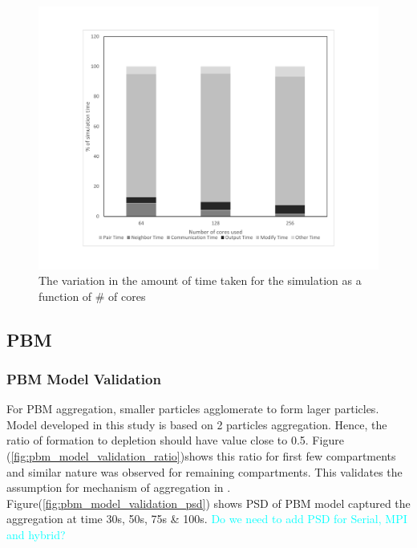 \documentclass[preprint,11pt,authoryear]{elsarticle}
\begin{document}
\begin{figure}[H]
\centering
\includegraphics[scale=0.5]{rslts_DEM_percent_plot.pdf}
\caption{The variation in the amount of time taken for the simulation as a function of \# of cores}
\label{fig:rslts_DEM_percent_plot}
\end{figure}


\subsection{PBM}
\subsubsection{PBM Model Validation}
For PBM aggregation, smaller particles agglomerate to form lager particles. Model developed in this study is based on 2 particles aggregation. Hence, the ratio of formation to depletion should have value close to 0.5. Figure (\ref{fig:pbm_model_validation_ratio})shows this ratio for first few compartments and similar nature was observed for remaining compartments. This validates the assumption for mechanism of aggregation in \cite{Barrasso2013}. Figure(\ref{fig:pbm_model_validation_psd}) shows PSD of PBM model captured the aggregation at time 30s, 50s, 75s \& 100s. \textcolor{cyan}{Do we need to add PSD for Serial, MPI and hybrid?}
\end{document}
